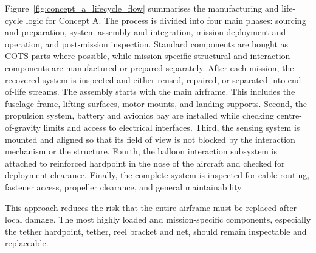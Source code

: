 Figure~\ref{fig:concept_a_lifecycle_flow} summarises the manufacturing and life-cycle logic for Concept A. The process is divided into four main phases: sourcing and preparation, system assembly and integration, mission deployment and operation, and post-mission inspection. Standard components are bought as COTS parts where possible, while mission-specific structural and interaction components are manufactured or prepared separately. After each mission, the recovered system is inspected and either reused, repaired, or separated into end-of-life streams.
The assembly starts with the main airframe. This includes the fuselage frame, lifting surfaces, motor mounts, and landing supports.  Second, the propulsion system, battery and avionics bay are installed while checking centre-of-gravity limits and access to electrical interfaces. Third, the sensing system is mounted and aligned so that its field of view is not blocked by the interaction mechanism or the structure. Fourth, the balloon interaction subsystem is attached to reinforced hardpoint in the nose of the aircraft and checked for deployment clearance. Finally, the complete system is inspected for cable routing, fastener access, propeller clearance, and general maintainability.



This approach reduces the risk that the entire airframe must be replaced after local damage. The most highly loaded and mission-specific components, especially the tether hardpoint, tether, reel bracket and net, should remain inspectable and replaceable.







